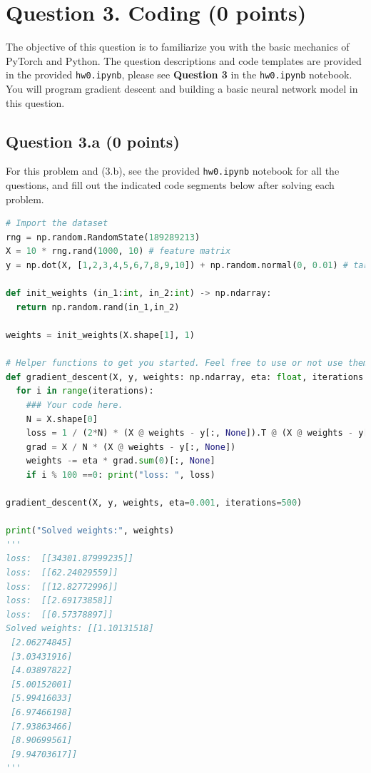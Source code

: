\documentclass[12pt]{article}
\begin{document}
\section*{Question 3. Coding (0 points) }
The objective of this question is to familiarize you with the basic mechanics of PyTorch and Python. The question descriptions and code templates are provided in the provided \texttt{hw0.ipynb}, please see \textbf{Question 3} in the \texttt{hw0.ipynb} notebook. You will program gradient descent and building a basic neural network model in this question.

\subsection*{Question 3.a (0 points) } 
For this problem and (3.b), see the provided \texttt{hw0.ipynb} notebook for all the questions, and fill out the indicated code segments below after solving 
each problem.

\begin{solution}
\begin{lstlisting}[language=Python]
# Import the dataset
rng = np.random.RandomState(189289213)
X = 10 * rng.rand(1000, 10) # feature matrix
y = np.dot(X, [1,2,3,4,5,6,7,8,9,10]) + np.random.normal(0, 0.01) # target vector

def init_weights (in_1:int, in_2:int) -> np.ndarray:
  return np.random.rand(in_1,in_2)

weights = init_weights(X.shape[1], 1)

# Helper functions to get you started. Feel free to use or not use them.
def gradient_descent(X, y, weights: np.ndarray, eta: float, iterations: int):
  for i in range(iterations):
    ### Your code here.
    N = X.shape[0]
    loss = 1 / (2*N) * (X @ weights - y[:, None]).T @ (X @ weights - y[:, None])
    grad = X / N * (X @ weights - y[:, None])
    weights -= eta * grad.sum(0)[:, None]
    if i % 100 ==0: print("loss: ", loss) 

gradient_descent(X, y, weights, eta=0.001, iterations=500)

print("Solved weights:", weights)
'''
loss:  [[34301.87999235]]
loss:  [[62.24029559]]
loss:  [[12.82772996]]
loss:  [[2.69173858]]
loss:  [[0.57378897]]
Solved weights: [[1.10131518]
 [2.06274845]
 [3.03431916]
 [4.03897822]
 [5.00152001]
 [5.99416033]
 [6.97466198]
 [7.93863466]
 [8.90699561]
 [9.94703617]]
'''
\end{lstlisting}
\end{solution}
\end{document}
